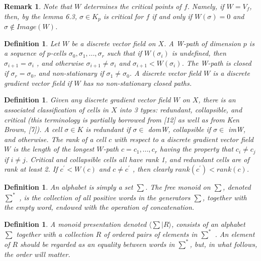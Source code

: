 \documentclass{amsart}
\newtheorem{Definition}[theorem]{Definition}
\newtheorem{Remark}[theorem]{Remark}
\newenvironment{definition}{\begin{Definition}\normalfont}{\end{Definition}}
\newenvironment{remark}{\begin{Remark}\normalfont}{\end{Remark}}
\begin{document}
\begin{remark} 
Note that $W$ determines the critical points of $f$. Namely, if
$W=V_{f}$, then, by the lemma 6.3, $\sigma\in K_p$ is critical for $f$ if and only if $W(\sigma)=0$ and $ \sigma\not\in Image(W)$.
\end{remark}

\begin{definition}
Let $W$ be a discrete vector field on $X$. A \textit{W-path of dimension $p$} is a sequence of $p$-cells $\sigma_0, \sigma_1, . . . , \sigma_r$ such that if $W(\sigma_i)$ is undefined, then $\sigma_{i+1} = \sigma_i$ , and otherwise $\sigma_{i+1} \neq \sigma_i$ and $\sigma_{i+1} < W(\sigma_i)$. The W-path is closed if $\sigma_r = \sigma_0$, and \textit{non-stationary} if $\sigma_1 \neq \sigma_0$. A discrete vector field $W$ is a \textit{discrete gradient vector field} if $W$ has no non-stationary closed paths.
\end{definition}

\begin{definition}
Given any discrete gradient vector field $W$ on $X$, there is an associated classification of cells in $X$ into 3 types: redundant, collapsible, and critical (this terminology is partially borrowed from [12] as well as from Ken Brown, [7]).
A cell $\sigma \in K$ is \textit{redundant} if $\sigma \in $ domW, \textit{collapsible} if $\sigma \in$ imW, and  otherwise. The \textit{rank} of a cell $c$ with respect to a discrete gradient vector
field $W$ is the length of the longest $W$-path $c = c_1, . . . , c_r$ having the property that $c_i \neq c_j$ if $i \neq j$. Critical and collapsible cells all have rank 1, and redundant cells are of rank at least 2. If $c^{\prime} < W(c)$ and $c \neq c^{\prime}$ , then clearly $rank(c^{\prime}) < rank(c)$.
\end{definition}

\begin{definition}
An \textit{alphabet} is simply a set $\sum$. The \textit{free monoid} on $\sum$, denoted $\sum^*$ , is the
collection of all positive words in the generators $\sum$, together with the empty
word, endowed with the operation of concatenation.
\end{definition}

\begin{definition}
A \textit{monoid presentation} denoted $\langle \sum | R \rangle$, consists of an alphabet $\sum$ together
with a collection $R$ of ordered pairs of elements in $\sum^*$ . An element of $R$ should
be regarded as an equality between words in $\sum^*$, but, in what follows, the order
will matter.
\end{definition}
\end{document}
